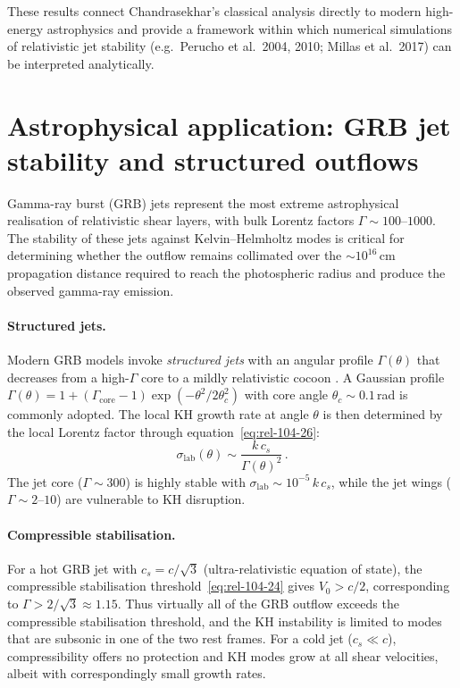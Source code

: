 These results connect Chandrasekhar's classical analysis directly to
modern high-energy astrophysics and provide a framework within which
numerical simulations of relativistic jet stability (e.g.\ Perucho et
al.\ 2004, 2010; Millas et al.\ 2017) can be interpreted analytically.

\section{Astrophysical application: GRB jet stability and structured outflows}
\label{sec:rel-11-104-grb}

Gamma-ray burst (GRB) jets represent the most extreme astrophysical
realisation of relativistic shear layers, with bulk Lorentz factors
$\Gamma \sim 100$--$1000$.  The stability of these jets against
Kelvin--Helmholtz modes is critical for determining whether the outflow
remains collimated over the $\sim 10^{16}\,$cm propagation distance
required to reach the photospheric radius and produce the observed
gamma-ray emission.

\paragraph{Structured jets.}
Modern GRB models invoke \emph{structured jets} with an angular
profile $\Gamma(\theta)$ that decreases from a high-$\Gamma$ core
to a mildly relativistic cocoon
\cite{AloyEtAl2000, ZhangWoosleyMacFadyen2003, MorsonyLazzatiBegelman2007}.
A Gaussian profile $\Gamma(\theta) = 1 + (\Gamma_{\mathrm{core}}-1)
\exp(-\theta^{2}/2\theta_{c}^{2})$ with core angle $\theta_{c} \sim 0.1\,$rad
is commonly adopted.  The local KH growth rate at angle $\theta$ is
then determined by the local Lorentz factor through
equation~\eqref{eq:rel-104-26}:
\begin{equation}
  \sigma_{\mathrm{lab}}(\theta) \sim \frac{k\,c_{s}}{\Gamma(\theta)^{2}}\,.
\end{equation}
The jet core ($\Gamma \sim 300$) is highly stable with
$\sigma_{\mathrm{lab}} \sim 10^{-5}\,k\,c_{s}$, while the jet wings
($\Gamma \sim 2$--$10$) are vulnerable to KH disruption.

\paragraph{Compressible stabilisation.}
For a hot GRB jet with $c_{s} = c/\sqrt{3}$ (ultra-relativistic equation
of state), the compressible stabilisation
threshold~\eqref{eq:rel-104-24} gives $V_{0} > c/2$, corresponding to
$\Gamma > 2/\sqrt{3} \approx 1.15$.  Thus virtually all of the GRB
outflow exceeds the compressible stabilisation threshold, and the KH
instability is limited to modes that are subsonic in one of the two
rest frames.  For a cold jet ($c_{s} \ll c$), compressibility offers
no protection and KH modes grow at all shear velocities, albeit
with correspondingly small growth rates.


